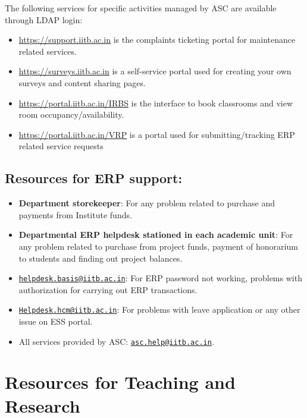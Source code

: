 \documentclass[
  10pt,
  a5paper,
  10pt,
  openany]{amsbook}
\providecommand{\tightlist}{%
  \setlength{\itemsep}{0pt}\setlength{\parskip}{0pt}}
\begin{document}
The following services for specific activities managed by ASC are
available through LDAP login:

\begin{itemize}
\tightlist
\item
  \url{https://support.iitb.ac.in} is the complaints ticketing portal
  for maintenance related services.
\item
  \url{https://surveys.iitb.ac.in} is a self-service portal used for
  creating your own surveys and content sharing pages.
\item
  \url{https://portal.iitb.ac.in/IRBS} is the interface to book
  classrooms and view room occupancy/availability.
\item
  \url{https://portal.iitb.ac.in/VRP} is a portal used for
  submitting/tracking ERP related service requests
\end{itemize}

\section{Resources for ERP support:}\label{resources-for-erp-support}

\begin{itemize}
\tightlist
\item
  \textbf{Department storekeeper}: For any problem related to purchase
  and payments from Institute funds.
\item
  \textbf{Departmental ERP helpdesk stationed in each academic unit}:
  For any problem related to purchase from project funds, payment of
  honorarium to students and finding out project balances.
\item
  \href{mailto:helpdesk.basis@iitb.ac.in}{\nolinkurl{helpdesk.basis@iitb.ac.in}}:
  For ERP password not working, problems with authorization for carrying
  out ERP transactions.
\item
  \href{mailto:Helpdesk.hcm@iitb.ac.in}{\nolinkurl{Helpdesk.hcm@iitb.ac.in}}:
  For problems with leave application or any other issue on ESS portal.
\item
  All services provided by ASC:
  \href{mailto:asc.help@iitb.ac.in}{\nolinkurl{asc.help@iitb.ac.in}}.
\end{itemize}

\chapter{Resources for Teaching and
Research}\label{resources-for-teaching-and-research}
\end{document}

